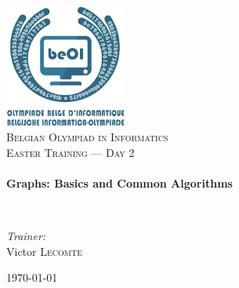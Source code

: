 \begin{titlepage}
\begin{center}

\includegraphics[width=0.3\textwidth]{./img/beoi-logo}~\\[1cm]

\textsc{\LARGE Belgian Olympiad in Informatics}\\[1.5cm]

\textsc{\Large Easter Training --- Day 2}\\[0.5cm]

\HRule \\[0.4cm]
{ \huge \bfseries Graphs: Basics and Common Algorithms \\[0.4cm] }

\HRule \\[1.5cm]

\begin{center} \large
\emph{Trainer:}\\
Victor \textsc{Lecomte}
\end{center}

\vfill

{\large \today}

\end{center}
\end{titlepage}
